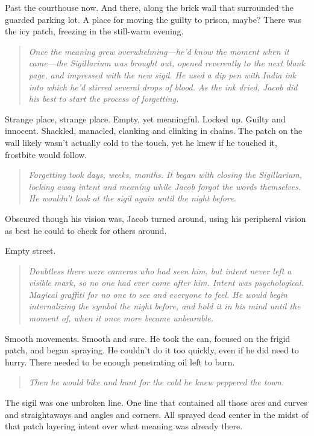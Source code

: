 Past the courthouse now. And there, along the brick wall that surrounded the guarded parking lot. A place for moving the guilty to prison, maybe? There was the icy patch, freezing in the still-warm evening.

\begin{quote}
\emph{Once the meaning grew overwhelming---he'd know the moment when it came---the Sigillarium was brought out, opened reverently to the next blank page, and impressed with the new sigil. He used a dip pen with India ink into which he'd stirred several drops of blood. As the ink dried, Jacob did his best to start the process of forgetting.}
\end{quote}

Strange place, strange place. Empty, yet meaningful. Locked up. Guilty and innocent. Shackled, manacled, clanking and clinking in chains. The patch on the wall likely wasn't actually cold to the touch, yet he knew if he touched it, frostbite would follow.

\begin{quote}
\emph{Forgetting took days, weeks, months. It began with closing the Sigillarium, locking away intent and meaning while Jacob forgot the words themselves. He wouldn't look at the sigil again until the night before.}
\end{quote}

Obscured though his vision was, Jacob turned around, using his peripheral vision as best he could to check for others around.

Empty street.

\begin{quote}
\emph{Doubtless there were cameras who had seen him, but intent never left a visible mark, so no one had ever come after him. Intent was psychological. Magical graffiti for no one to see and everyone to feel. He would begin internalizing the symbol the night before, and hold it in his mind until the moment of, when it once more became unbearable.}
\end{quote}

Smooth movements. Smooth and sure. He took the can, focused on the frigid patch, and began spraying. He couldn't do it too quickly, even if he did need to hurry. There needed to be enough penetrating oil left to burn.

\begin{quote}
\emph{Then he would bike and hunt for the cold he knew peppered the town.}
\end{quote}

The sigil was one unbroken line. One line that contained all those arcs and curves and straightaways and angles and corners. All sprayed dead center in the midst of that patch layering intent over what meaning was already there.

